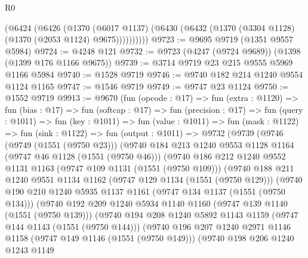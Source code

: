 \begin{lexlean}{R0}
\begin{coremodule}
          (@6424
            (@6426
              (@1370
                (@6017 @1137)
                (@6430 (@6432 (@1370 (@3304 @1128) (@1370 (@2053 @1124) @9675))))))))))
@9723 := @9695 @9719 (@1351 @9557 @5984)
@9724 := @4248 @121
@9732 := @9723 (@4247 (@9724 @9689)) (@1398 (@1399 @176 @1166 @9675))
@9739 := @3714 @9719 @23 @215 @9555 @5969 @1166 @5984
@9740 := @1528 @9719
@9746 := @9740 @182 @214 @1240 @9554 @1124 @1165
@9747 := @1546 @9719
@9749 := @9747 @23 @1124
@9750 := @1552 @9719
@9913 := @9670
    (fun (opcode : @17) =>
    fun (extra : @1120) =>
    fun (bias : @17) =>
    fun (softcap : @17) =>
    fun (precision : @17) =>
    fun (query : @1011) =>
    fun (key : @1011) =>
    fun (value : @1011) =>
    fun (mask : @1122) =>
    fun (sink : @1122) =>
    fun (output : @1011) =>
    @9732
      (@9739
        (@9746
          (@9749 (@1551 (@9750 @23)))
          (@9740
            @184
            @213
            @1240
            @9553
            @1128
            @1164
            (@9747 @46 @1128 (@1551 (@9750 @46)))
            (@9740
              @186
              @212
              @1240
              @9552
              @1131
              @1163
              (@9747 @109 @1131 (@1551 (@9750 @109)))
              (@9740
                @188
                @211
                @1240
                @9551
                @1134
                @1162
                (@9747 @129 @1134 (@1551 (@9750 @129)))
                (@9740
                  @190
                  @210
                  @1240
                  @5935
                  @1137
                  @1161
                  (@9747 @134 @1137 (@1551 (@9750 @134)))
                  (@9740
                    @192
                    @209
                    @1240
                    @5934
                    @1140
                    @1160
                    (@9747 @139 @1140 (@1551 (@9750 @139)))
                    (@9740
                      @194
                      @208
                      @1240
                      @5892
                      @1143
                      @1159
                      (@9747 @144 @1143 (@1551 (@9750 @144)))
                      (@9740
                        @196
                        @207
                        @1240
                        @2971
                        @1146
                        @1158
                        (@9747 @149 @1146 (@1551 (@9750 @149)))
                        (@9740
                          @198
                          @206
                          @1240
                          @1243
                          @1149

\end{coremodule}
\end{lexlean}

